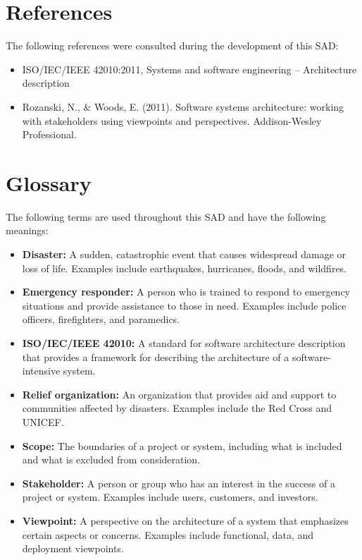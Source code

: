\documentclass[a4paper]{article}
\begin{document}
    \section{References}
    The following references were consulted during the development of this SAD:
    \begin{itemize}
        \item ISO/IEC/IEEE 42010:2011, Systems and software engineering -- Architecture description
        \item Rozanski, N., & Woods, E. (2011). Software systems architecture: working with stakeholders using viewpoints and 
        perspectives. Addison-Wesley Professional.
    \end{itemize}

    \section{Glossary}
    The following terms are used throughout this SAD and have the following meanings:
    \begin{itemize}
        \item \textbf{Disaster:} A sudden, catastrophic event that causes widespread damage or loss of life. Examples include 
        earthquakes, hurricanes, floods, and wildfires.
        \item \textbf{Emergency responder:} A person who is trained to respond to emergency situations and provide assistance to 
        those in need. Examples include police officers, firefighters, and paramedics.
        \item \textbf{ISO/IEC/IEEE 42010:} A standard for software architecture description that provides a framework for 
        describing the architecture of a software-intensive system.
        \item \textbf{Relief organization:} An organization that provides aid and support to communities affected by disasters. 
        Examples include the Red Cross and UNICEF.
        \item \textbf{Scope:} The boundaries of a project or system, including what is included and what is excluded from
        consideration.
        \item \textbf{Stakeholder:} A person or group who has an interest in the success of a project or system. Examples include
        users, customers, and investors.
        \item \textbf{Viewpoint:} A perspective on the architecture of a system that emphasizes certain aspects or concerns.
        Examples include functional, data, and deployment viewpoints.
    \end{itemize}
\end{document}
